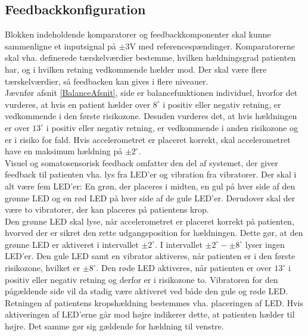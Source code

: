 \subsection{Feedbackkonfiguration}\label{KomparatorAfs}
Blokken indeholdende komparatorer og feedbackkomponenter skal kunne sammenligne et inputsignal på $\pm3$V med referencespændinger. Komparatorerne skal vha. definerede tærskelværdier bestemme, hvilken hældningsgrad patienten har, og i hvilken retning vedkommende hælder mod. Der skal være flere tærskelværdier, så feedbacken kan gives i flere niveauer.\\
Jævnfør afsnit \ref{BalanceAfsnit}, side \pageref{BalanceAfsnit} er balancefunktionen individuel, hvorfor det vurderes, at hvis en patient hælder over $8^{\circ}$ i positiv eller negativ retning, er vedkommende i den første risikozone. Desuden vurderes det, at hvis hældningen er over $13^{\circ}$ i positiv eller negativ retning, er vedkommende i anden risikozone og er i risiko for fald. Hvis accelerometret er placeret korrekt, skal accelerometret have en maksimum hældning på $\pm2^{\circ}$. \\
Visuel og somatosensorisk feedback omfatter den del af systemet, der giver feedback til patienten vha. lys fra LED'er og vibration fra vibratorer. Der skal i alt være fem LED'er: En grøn, der placeres i midten, en gul på hver side af den grønne LED og en rød LED på hver side af de gule LED'er. Derudover skal der være to vibratorer, der kan placeres på patientens krop.\\
Den grønne LED skal lyse, når accelerometret er placeret korrekt på patienten, hvorved der er sikret den rette udgangsposition for hældningen. Dette gør, at den grønne LED er aktiveret i intervallet $\pm2^{\circ}$. I intervallet $\pm2^{\circ}-\pm8^{\circ}$ lyser ingen LED'er. Den gule LED samt en vibrator aktiveres, når patienten er i den første risikozone, hvilket er $\pm8^{\circ}$. Den røde LED aktiveres, når patienten er over $13^{\circ}$ i positiv eller negativ retning og derfor er i risikozone to. Vibratoren for den pågældende side vil da stadig være aktiveret ved både den gule og røde LED. Retningen af patientens kropshældning bestemmes vha. placeringen af LED. Hvis aktiveringen af LED'erne går mod højre indikerer dette, at patienten hælder til højre. Det samme gør sig gældende for hældning til venstre. \\
